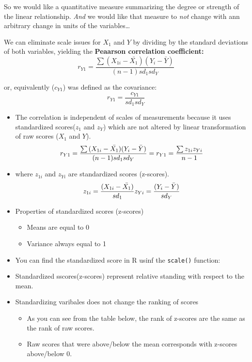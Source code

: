 \documentclass[
]{book}
\newenvironment{Shaded}{\begin{snugshade}}{\end{snugshade}}
\newcommand{\FunctionTok}[1]{\textcolor[rgb]{0.00,0.00,0.00}{#1}}
\newcommand{\NormalTok}[1]{#1}
\newcommand{\SpecialCharTok}[1]{\textcolor[rgb]{0.00,0.00,0.00}{#1}}
\providecommand{\tightlist}{%
  \setlength{\itemsep}{0pt}\setlength{\parskip}{0pt}}
\begin{document}
So we would like a quantitative measure summarizing the degree or strength of the linear relationship. \emph{And} we would like that measure to \emph{not} change with ann arbitrary change in units of the variables\ldots{}

We can eliminate scale issues for \(X_1\) and \(Y\) by dividing by the standard deviations of both variables, yielding the \textbf{Peaarson correlation coefficient:}
\[
r_{Y1} = \frac{\sum{(X_{1i} - \bar{X_1})(Y_{i} - \bar{Y})}}{(n-1)sd_{1}sd_{Y}}
\]

or, equivalently (\(c_{Y1}\)) was defined as the covariance:
\[
r_{Y1} = \frac{c_{Y1}}{sd_{1}sd_{Y}}
\]

\begin{itemize}
\item
  The correlation is independent of scales of measurements because it uses standardized scores(\(z_1\) and \(z_Y\)) which are not altered by linear transformation of raw scores (\(X_1\) and \(Y\)).
  \[
  r_{Y1} = \frac{\sum{(X_{1i} - \bar{X_1})(Y_{i} - \bar{Y})}}{(n-1)sd_{1}sd_{Y}} \\
  = r_{Y1} = \frac{\sum{z_{1i}z_{Yi}}}{n -1}
  \]
\item
  where \(z_{1i}\) and \(z_{Yi}\) are standardized scores (z-scores).
  \[
  z_{1i} = \frac{(X_{1i} - \bar{X_1})}{sd_1} \\
  z_{Yi} = \frac{(Y_{i} - \bar{Y})}{sd_Y}
  \]
\item
  Properties of standardized scores (z-scores)

  \begin{itemize}
  \tightlist
  \item
    Means are equal to 0
  \item
    Variance always equal to 1
  \end{itemize}
\item
  You can find the standardized score in R usinf the \texttt{scale()} function:
\end{itemize}

\begin{Shaded}
\end{Shaded}

\begin{itemize}
\tightlist
\item
  Standardized sscores(z-scores) represent relative standing with respect to the mean.
\item
  Standardizing varibales does not change the ranking of scores

  \begin{itemize}
  \tightlist
  \item
    As you can see from the table below, the rank of z-scores are the same as the rank of raw scores.
  \item
    Raw scores that were above/below the mean corresponds with z-scores above/below 0.
  \end{itemize}
\end{itemize}
\end{document}

